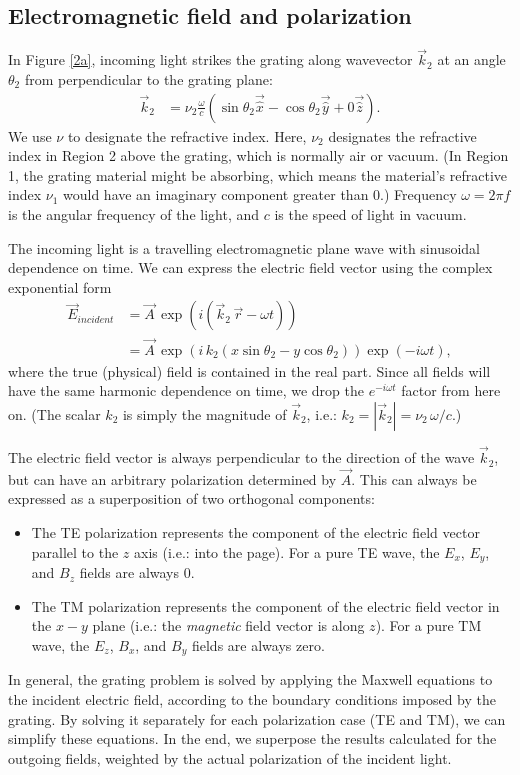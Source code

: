 \subsection{Electromagnetic field and polarization}
In Figure \ref{2a}, incoming light strikes the grating along wavevector $\vec k_2$ at an angle $\theta_2$ from perpendicular to the grating plane:
\begin{align}
\vec k_2 &= \nu_2 \frac{\omega}{c} \left( \sin \theta_2 \vec{\hat x} - \cos \theta_2 \vec{\hat y} + 0 \vec{\hat z} \right).
\end{align}
We use $\nu$ to designate the refractive index. Here, $\nu_2$ designates the refractive index in Region 2 above the grating, which is normally air or vacuum.  (In Region 1, the grating material might be absorbing, which means the material's refractive index $\nu_1$ would have an imaginary component greater than 0.)  Frequency $\omega = 2\pi f$ is the angular frequency of the light, and $c$ is the speed of light in vacuum.

The incoming light is a travelling electromagnetic plane wave with sinusoidal dependence on time.  We can express the electric field vector using the complex exponential form
\begin{align}
\label{eqnPlaneWave}
\vec E_{incident} &= \vec A\, \exp \left(i (\vec k_2 \,  \vec r - \omega t)\right)  \\
&= \vec A\, \exp \left(i\, k_2 (x \sin \theta_2 - y \cos \theta_2)\right)\exp \left(- i \omega t\right),
\end{align}
where the true (physical) field is contained in the real part.  Since all fields will have the same harmonic dependence on time, we drop the $e^{-i\omega t}$ factor from here on.  (The scalar $k_2$ is simply the magnitude of $\vec k_2$, i.e.: $k_2 = \left| \vec k_2 \right| = \nu_2\, \omega/c$.)

The electric field vector is always perpendicular to the direction of the wave $\vec k_2$, but can have an arbitrary polarization determined by $\vec A$.  This can always be expressed as a superposition of two orthogonal components:
\begin{itemize}
\item The TE polarization represents the component of the electric field vector parallel to the $z$ axis (i.e.: into the page).  For a pure TE wave, the $E_x$, $E_y$, and $B_z$ fields are always 0.
\item The TM polarization represents the component of the electric field vector in the $x-y$ plane (i.e.: the \emph{magnetic} field vector is along $z$).  For a pure TM wave, the $E_z$, $B_x$, and $B_y$ fields are always zero.
\end{itemize}
In general, the grating problem is solved by applying the Maxwell equations to the incident electric field, according to the boundary conditions imposed by the grating.  By solving it separately for each polarization case (TE and TM), we can simplify these equations.  In the end, we superpose the results calculated for the outgoing fields, weighted by the actual polarization of the incident light.


